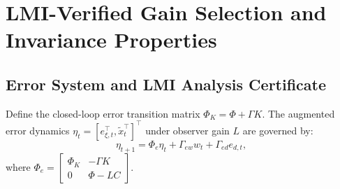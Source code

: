 \documentclass[journal]{IEEEtran}
\begin{document}
\section{LMI-Verified Gain Selection and Invariance Properties}

\subsection{Error System and LMI Analysis Certificate}

Define the closed-loop error transition matrix $\Phi_K = \Phi + \Gamma K$. The augmented error dynamics $\eta_t = [e_{\xi,t}^\top, \tilde x_t^\top]^\top$ under observer gain $L$ are governed by:
\begin{equation}
\eta_{t+1} = \Phi_e \eta_t + \Gamma_{ew} w_t + \Gamma_{ed} e_{d,t},
\end{equation}
where $\Phi_e = \begin{bmatrix} \Phi_K & -\Gamma K \\ 0 & \Phi - L C \end{bmatrix}$.
\end{document}
